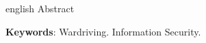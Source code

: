 \documentclass[
	article,			%
	12pt,				%
	oneside,			%
	a4paper,			%
	english,			%
	brazil,				%
	sumario=tradicional
	]{abntex2}
\begin{document}

\emptythanks
\maketitle

\renewcommand{\resumoname}{Abstract}
\begin{resumoumacoluna}
 \begin{otherlanguage*}{english}
   Abstract

   \vspace{\onelineskip}

   \noindent
   \textbf{Keywords}: Wardriving. Information Security.
 \end{otherlanguage*}
\end{resumoumacoluna}


\end{document}
